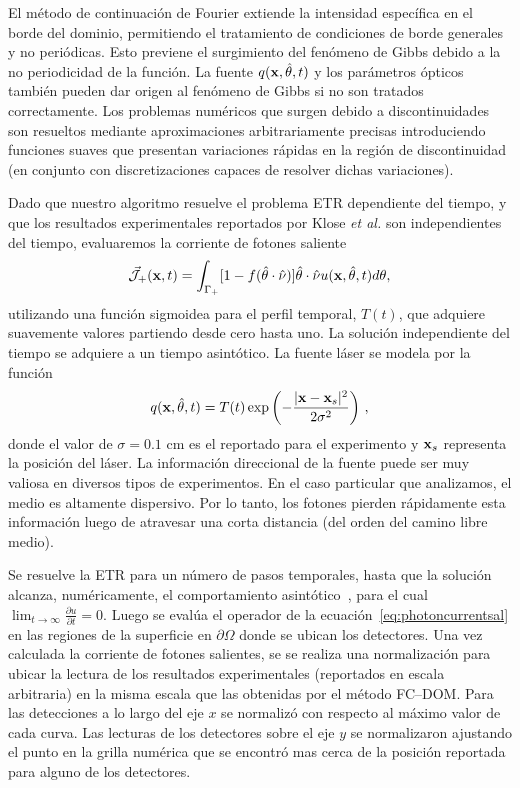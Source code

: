 El método de continuación de Fourier extiende 
la intensidad específica en el borde del dominio, 
permitiendo el tratamiento de condiciones de borde generales y no periódicas.  
Esto previene el surgimiento del fenómeno de Gibbs debido a la no periodicidad 
de la función. La fuente $q(\mathbf{x},\hat{\theta},t)$ y los parámetros ópticos 
también pueden dar origen al fenómeno de Gibbs si no son 
tratados correctamente. Los problemas numéricos que surgen 
debido a discontinuidades son resueltos mediante aproximaciones arbitrariamente precisas 
introduciendo funciones suaves que presentan 
variaciones rápidas en la región de discontinuidad (en conjunto 
con discretizaciones capaces de resolver dichas variaciones).

Dado que nuestro algoritmo resuelve el problema ETR dependiente del tiempo, 
y que los resultados experimentales reportados por Klose \textit{et al.} 
son independientes del tiempo, evaluaremos la corriente de fotones saliente 
\begin{equation}
 \vec{ \mathcal{J}}_+(\mathbf{x},t)=\int_{\Gamma_+} [1-f(\hat{\theta} \cdot \hat{\nu})] \hat{\theta} \cdot \hat{\nu} u(\mathbf{x},\hat{\theta},t) d\theta,
\label{eq:photoncurrentsal}
\end{equation}
utilizando una función sigmoidea para el perfil temporal, $T(t)$, 
que adquiere suavemente valores partiendo desde cero 
hasta uno. La solución independiente del tiempo 
se adquiere a un tiempo asintótico.
La fuente láser se modela por la función
\begin{equation}
q(\mathbf{x},\hat{\theta},t)=T(t)\exp \left(  -\frac{|\mathbf{x}-\mathbf{x}_s|^2}{2\sigma^2} \right)  \, ,
\label{eq:sourceGauss}
\end{equation}
donde el valor de $\sigma=0.1$ cm es el reportado para el experimento y $\mathbf{x}_s$ 
representa la posición del láser. La información direccional de la fuente 
puede ser muy valiosa en diversos tipos de experimentos. 
En el caso particular que analizamos, el medio es altamente dispersivo. Por lo tanto, los 
fotones pierden rápidamente esta información 
luego de atravesar una corta distancia (del orden del camino libre medio).

Se resuelve la ETR para un número de pasos temporales, 
hasta que la solución alcanza, numéricamente, el comportamiento 
asintótico~\cite{Bruno2010}, para el cual $\lim_{t\to \infty} \frac{\partial u}{\partial t}=0$. 
Luego se evalúa el operador de la ecuación~\eqref{eq:photoncurrentsal} 
en las regiones de la superficie en $\partial \Omega$ 
donde se ubican los detectores.
Una vez  calculada la corriente de fotones salientes, se
se realiza una normalización para ubicar la lectura 
de los resultados experimentales (reportados en escala arbitraria) 
en la misma escala que las obtenidas por el método FC--DOM. 
Para las detecciones a lo largo del eje $x$ se normalizó 
con respecto al máximo valor de cada curva. 
 Las lecturas de los detectores sobre el eje $y$ 
 se normalizaron ajustando el punto en la grilla numérica 
 que se encontró mas cerca de la posición reportada 
 para alguno de los detectores. 
 
